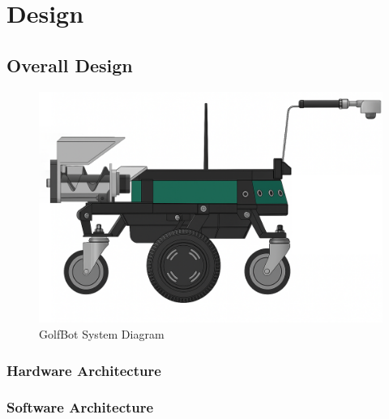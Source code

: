 \chapter{Design}
\label{chap:design}

\section{Overall Design}
\begin{figure}
    \centering
    \includegraphics[width=0.5\linewidth]{figures/complete.png}
    \caption{GolfBot System Diagram}
    \label{fig:golfbot_system_diagram}
\end{figure}

\subsection{Hardware Architecture}

\subsection{Software Architecture}
